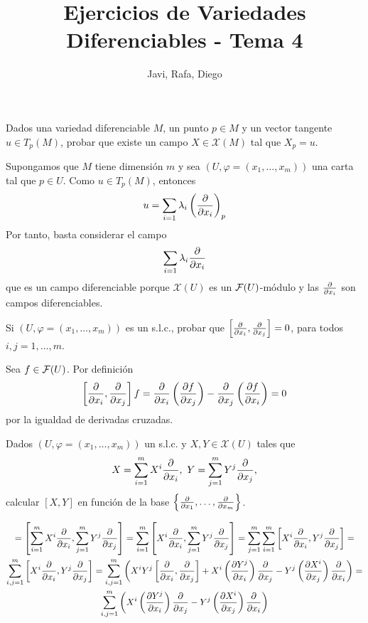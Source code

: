 \documentclass[twoside]{article}
\newcounter{ejercicio}
\begin{document}
\title{Ejercicios de Variedades Diferenciables - Tema 4}
\author{Javi, Rafa, Diego}
\maketitle

\begin{ejercicio}{1}
Dados una variedad diferenciable $M$, un punto $p\in M$ y un
vector tangente $u\in T_p(M)$, probar que existe un campo
$X\in\mathcal{X}(M)$ tal que $X_p=u$. 
\end{ejercicio}
\begin{solucion}
Supongamos que $M$ tiene dimensión $m$ y sea $(U,\varphi=(x_1,\dots,x_m))$ una carta tal que $p\in U$. Como $u\in T_p(M)$, entonces 
$$u=\sum_{i=1}\lambda_i\left(\frac{\partial }{\partial x_i}\right)_p$$
Por tanto, basta considerar el campo 
$$\sum_{i=1}\lambda_i\frac{\partial }{\partial x_i}$$
que es un campo diferenciable porque $\mathcal{X}(U)$ es un $\mathcal{F}(U)$-módulo y las $\frac{\partial }{\partial x_i}$ son campos diferenciables.
\end{solucion}

\newpage

\begin{ejercicio}{2}
Si $(U,\varphi=(x_1,\dots
,x_m))$ es un s.l.c., probar que
$\left[\frac{\partial }{\partial x_i},\frac{\partial }{\partial x_j}\right]=0$, para todos $i,j=1,\dots ,m$.
\end{ejercicio}
\begin{solucion}
Sea $f\in\mathcal{F}(U)$. Por definición 
$$\left[\frac{\partial }{\partial x_i},\frac{\partial }{\partial x_j}\right]f=\frac{\partial }{\partial x_i}\left(\frac{\partial f}{\partial x_j}\right)-\frac{\partial }{\partial x_j}\left(\frac{\partial f}{\partial x_i}\right)=0$$
por la igualdad de derivadas cruzadas. 
\end{solucion}

\newpage

\begin{ejercicio}{3}
Dados $(U,\varphi=(x_1,\dots ,x_m))$ un s.l.c. y
$X,Y\in\mathcal{X}(U)$ tales que
$$X=\sum_{i=1}^mX^i\frac{\partial }{\partial x_i},\mbox{ }Y=\sum_{j=1}^mY^j\frac{\partial }{\partial x_j},$$
calcular $[X,Y]$ en función de la base $\left\{\frac{\partial }{\partial x_1},\dots ,\frac{\partial }{\partial x_m}\right\}$.
\end{ejercicio}
\begin{solucion}
\begin{gather*}
[X,Y]=\left[\sum_{i=1}^mX^i\parcial{}{x_i},\sum_{j=1}^mY^j\parcial{}{x_j}\right]=\sum_{i=1}^m\left[X^i\parcial{}{x_i},\sum_{j=1}^mY^j\parcial{}{x_j}\right]=\sum_{j=1}^m\sum_{i=1}^m\left[X^i\parcial{}{x_i},Y^j\parcial{}{x_j}\right]=\\
\sum_{i,j=1}^m\left[X^i\parcial{}{x_i},Y^j\parcial{}{x_j}\right]=\sum_{i,j=1}^m \left(X^iY^j\left[\parcial{}{x_i},\parcial{}{x_j}\right]+X^i\left(\parcial{Y^j}{x_i}\right)\parcial{}{x_j}-Y^j\left(\parcial{X^i}{x_j}\right)\parcial{}{x_i}\right)=\\
\sum_{i,j=1}^m \left(X^i\left(\parcial{Y^j}{x_i}\right)\parcial{}{x_j}-Y^j\left(\parcial{X^i}{x_j}\right)\parcial{}{x_i}\right)
\end{gather*}
\end{solucion}
\end{document}
